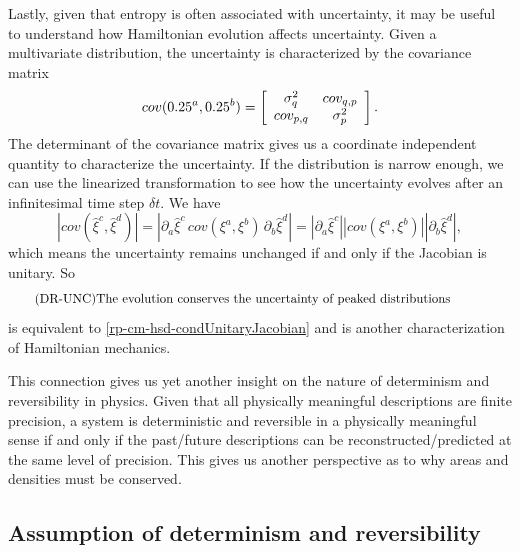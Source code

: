 Lastly, given that entropy is often associated with uncertainty, it may be useful to understand how Hamiltonian evolution affects uncertainty. Given a multivariate distribution, the uncertainty is characterized by the covariance matrix
\begin{equation}
	cov(\xi^a, \xi^b) = \left[\begin{array}{ c c }
		\sigma^2_q & cov_{q, p} \\
		cov_{p, q} & \sigma^2_p \\
	\end{array} \right].
\end{equation}
The determinant of the covariance matrix gives us a coordinate independent quantity to characterize the uncertainty. If the distribution is narrow enough, we can use the linearized transformation to see how the uncertainty evolves after an infinitesimal time step $\delta t$. We have
\begin{equation}
	\left| cov(\hat{\xi}^c, \hat{\xi}^d) \right| = \left| \partial_a \hat{\xi}^c  \, cov(\xi^a, \xi^b) \, \partial_b \hat{\xi}^d  \right| = \left| \partial_a \hat{\xi}^c \right| \left| cov(\xi^a, \xi^b) \right| \left| \partial_b \hat{\xi}^d  \right|,
\end{equation}
which means the uncertainty remains unchanged if and only if the Jacobian is unitary. So
\begin{equation}\label{rp-cm-hsd-condUncertainty}
	\tag{DR-UNC}
	\eqtext{The evolution conserves the uncertainty of peaked distributions}	
\end{equation}
is equivalent to \ref{rp-cm-hsd-condUnitaryJacobian} and is another characterization of Hamiltonian mechanics.


This connection gives us yet another insight on the nature of determinism and reversibility in physics. Given that all physically meaningful descriptions are finite precision, a system is deterministic and reversible in a physically meaningful sense if and only if the past/future descriptions can be reconstructed/predicted at the same level of precision. This gives us another perspective as to why areas and densities must be conserved.

\subsection{Assumption of determinism and reversibility}

